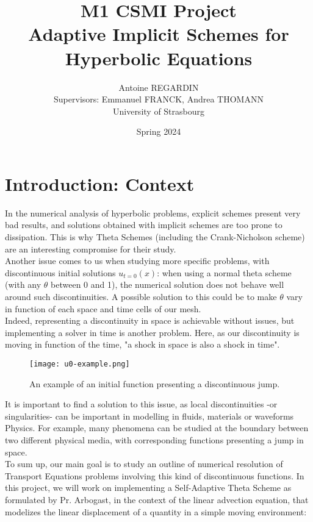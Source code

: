 \documentclass[12pt]{article}
\begin{document}
\def\spacingset#1{\renewcommand{\baselinestretch}%
{#1}\small\normalsize} \spacingset{1}

\title{\bf M1 CSMI Project\\ Adaptive Implicit Schemes for Hyperbolic Equations}
\author{Antoine REGARDIN\hspace{.2cm}\\
    Supervisors: Emmanuel FRANCK, Andrea THOMANN\\
    University of Strasbourg\\ }
\date{Spring 2024}
\maketitle

\tableofcontents

\newpage

\section{Introduction: Context}
In the numerical analysis of hyperbolic problems, explicit schemes present very bad results, and solutions obtained with implicit schemes
are too prone to dissipation. This is why Theta Schemes (including the Crank-Nicholson scheme) are an interesting compromise for their study.\\
Another issue comes to us when studying more specific problems, with discontinuous initial solutions $u_{t=0}(x)$: when using a normal theta scheme (with any $\theta$ between 0 and 1),
the numerical solution does not behave well around such discontinuities. A possible solution to this could be to make $\theta$ vary in function of each space and time cells of our mesh.\\
Indeed, representing a discontinuity in space is achievable without issues, but implementing a solver in time is another problem.
Here, as our discontinuity is moving in function of the time, "a shock in space is also a shock in time".\\
\vspace{10pt}
\begin{figure}[H]
    \centering
    \texttt{[image: u0-example.png]}
    \caption{An example of an initial function presenting a discontinuous jump.}
\end{figure}

It is important to find a solution to this issue, as local discontinuities -or singularities- can be important in modelling in fluids, materials or waveforms Physics.
For example, many phenomena can be studied at the boundary between two different physical media,
with corresponding functions presenting a jump in space.\\
To sum up, our main goal is to study an outline of numerical resolution of Transport Equations problems
involving this kind of discontinuous functions. In this project, we will work on implementing a Self-Adaptive Theta Scheme as formulated by Pr. Arbogast, 
in the context of the linear advection equation, that modelizes the linear displacement of a quantity in a simple moving environment:
\end{document}
